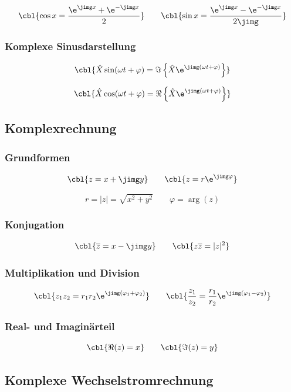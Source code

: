 \[
\cbl{\cos x = \frac{\e^{\jimg x} + \e^{-\jimg x}}{2}}
\qquad
\cbl{\sin x = \frac{\e^{\jimg x} - \e^{-\jimg x}}{2\jimg}}
\]

\subsubsection{Komplexe Sinusdarstellung}

\[
\cbl{\hat X \sin(\omega t + \varphi) = \Im\left\{ \hat X \e^{\jimg(\omega t + \varphi)} \right\}}
\]

\[
\cbl{\hat X \cos(\omega t + \varphi) = \Re\left\{ \hat X \e^{\jimg(\omega t + \varphi)} \right\}}
\]

\subsection{Komplexrechnung}

\subsubsection{Grundformen}

\[
\cbl{z = x + \jimg y}
\qquad
\cbl{z = r \e^{\jimg \varphi}}
\]

\[
r = |z| = \sqrt{x^2 + y^2}
\qquad
\varphi = \arg(z)
\]

\subsubsection{Konjugation}

\[
\cbl{\overline{z} = x - \jimg y}
\qquad
\cbl{z \overline{z} = |z|^2}
\]

\subsubsection{Multiplikation und Division}

\[
\cbl{z_1 z_2 = r_1 r_2 \e^{\jimg (\varphi_1 + \varphi_2)}}
\qquad
\cbl{\frac{z_1}{z_2} = \frac{r_1}{r_2} \e^{\jimg (\varphi_1 - \varphi_2)}}
\]

\subsubsection{Real- und Imaginärteil}

\[
\cbl{\Re(z) = x}
\qquad
\cbl{\Im(z) = y}
\]

\subsection{Komplexe Wechselstromrechnung}

